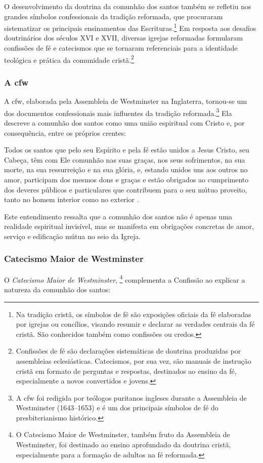 O desenvolvimento da doutrina da comunhão dos santos também se refletiu nos grandes símbolos confessionais da tradição reformada, que procuraram sistematizar os principais ensinamentos das Escrituras.\footnote{Na tradição cristã, os símbolos de fé são exposições oficiais da fé elaboradas por igrejas ou concílios, visando resumir e declarar as verdades centrais da fé cristã. São conhecidos também como confissões ou credos.} Em resposta aos desafios doutrinários dos séculos XVI e XVII, diversas igrejas reformadas formularam confissões de fé e catecismos que se tornaram referenciais para a identidade teológica e prática da comunidade cristã.\footnote{Confissões de fé são declarações sistemáticas de doutrina produzidas por assembleias eclesiásticas. Catecismos, por sua vez, são manuais de instrução cristã em formato de perguntas e respostas, destinados ao ensino da fé, especialmente a novos convertidos e jovens.}

\subsubsection{A \gls{cfw}} 
A \gls{cfw}, elaborada pela Assembleia de Westminster na Inglaterra, tornou-se um dos documentos confessionais mais influentes da tradição reformada.\footnote{A \gls{cfw} foi redigida por teólogos puritanos ingleses durante a Assembleia de Westminster (1643–1653) e é um dos principais símbolos de fé do presbiterianismo histórico.} Ela descreve a comunhão dos santos como uma união espiritual com Cristo e, por consequência, entre os próprios crentes:

\begin{citacao}
    Todos os santos que pelo seu Espírito e pela fé estão unidos a Jesus Cristo, seu Cabeça, têm com Ele comunhão nas suas graças, nos seus sofrimentos, na sua morte, na sua ressurreição e na sua glória, e, estando unidos uns aos outros no amor, participam dos mesmos dons e graças e estão obrigados ao cumprimento dos deveres públicos e particulares que contribuem para o seu mútuo proveito, tanto no homem interior como no exterior \cite[Cap.~XXVI, §~1º]{cfw}.
\end{citacao}

Este entendimento ressalta que a comunhão dos santos não é apenas uma realidade espiritual invisível, mas se manifesta em obrigações concretas de amor, serviço e edificação mútua no seio da Igreja.

\subsubsection{Catecismo Maior de Westminster}
O \textit{Catecismo Maior de Westminster}, \footnote{O Catecismo Maior de Westminster, também fruto da Assembleia de Westminster, foi destinado ao ensino aprofundado da doutrina cristã, especialmente para a formação de adultos na fé reformada.} complementa a Confissão ao explicar a natureza da comunhão dos santos:

